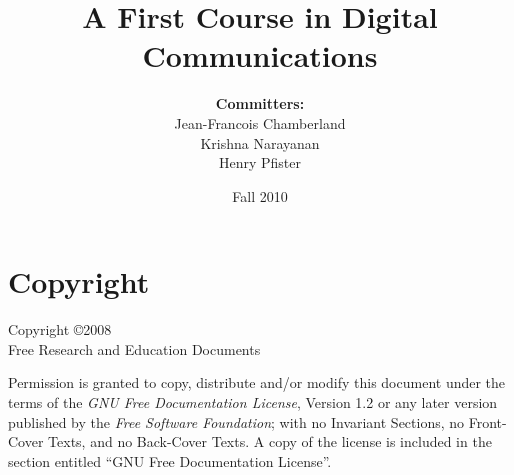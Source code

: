 \documentclass[12pt,openright]{book}
\begin{document}
\frontmatter

\author{
\textbf{Committers:} \\
Jean-Francois Chamberland \\
Krishna Narayanan \\
Henry Pfister}

\title{A First Course in Digital Communications}

\date{Fall 2010}

\maketitle

\chapter*{Copyright}
Copyright \copyright 2008 \\
Free Research and Education Documents

Permission is granted to copy, distribute and/or modify this document under the terms of the \emph{GNU Free Documentation License}, Version 1.2 or any later version published by the \emph{Free Software Foundation}; with no Invariant Sections, no Front-Cover Texts, and no Back-Cover Texts.
A copy of the license is included in the section entitled ``GNU Free Documentation License''.

\tableofcontents



\mainmatter









\appendix

%

%

\backmatter

\printindex
\end{document}
